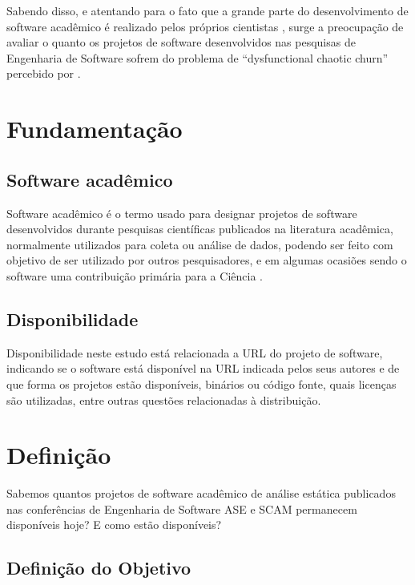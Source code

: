 Sabendo disso, e atentando para o fato que a grande parte do desenvolvimento de
software acadêmico é realizado pelos próprios cientistas \cite{hettrick2014uk,
momcheva2015software}, surge a preocupação de avaliar o quanto os projetos de
software desenvolvidos nas pesquisas de Engenharia de Software sofrem do
problema de ``dysfunctional chaotic churn'' percebido por .


\section{Fundamentação} \label{estudo1:fundamentacao} %

\subsection{Software acadêmico}

Software acadêmico é o termo usado para designar 
projetos de software desenvolvidos durante pesquisas científicas publicados
na literatura acadêmica, normalmente utilizados para coleta ou análise de
dados, podendo ser feito com objetivo de ser utilizado por outros
pesquisadores, e em algumas ocasiões sendo o software uma contribuição primária
para a Ciência \cite{howison2011scientific}.

\subsection{Disponibilidade}

Disponibilidade neste estudo está relacionada a URL do projeto de software,
indicando se o software está disponível na URL indicada pelos seus autores e de
que forma os projetos estão disponíveis, binários ou código fonte, quais
licenças são utilizadas, entre outras questões relacionadas à distribuição.


\section{Definição} \label{estudo1:definicao} %

Sabemos quantos projetos de software acadêmico de análise estática publicados
nas conferências de Engenharia de Software ASE e SCAM permanecem disponíveis
hoje? E como estão disponíveis?

\subsection{Definição do Objetivo}

